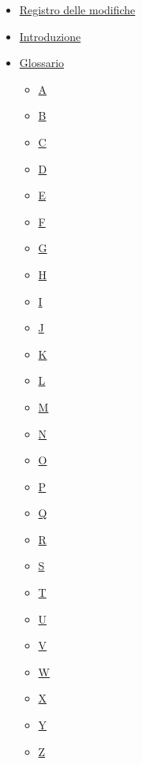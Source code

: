\documentclass[a4paper,12pt]{article}
\begin{document}
\begin{itemize}
    \item \hyperref[sec:Registro delle modifiche]{Registro delle modifiche}
    \item \hyperref[sec:introduzione]{Introduzione}
    \item \hyperref[sec:glossario]{Glossario}
    \begin{itemize}
        \item \hyperref[sec:glossario]{\gls{A}}
        \item \hyperref[sec:glossario]{\gls{B}}
        \item \hyperref[sec:glossario]{\gls{C}}
        \item \hyperref[sec:glossario]{\gls{D}}
        \item \hyperref[sec:glossario]{\gls{E}}
        \item \hyperref[sec:glossario]{\gls{F}}
        \item \hyperref[sec:glossario]{\gls{G}}
        \item \hyperref[sec:glossario]{\gls{H}}
        \item \hyperref[sec:glossario]{\gls{I}}
        \item \hyperref[sec:glossario]{\gls{J}}
        \item \hyperref[sec:glossario]{\gls{K}}
        \item \hyperref[sec:glossario]{\gls{L}}
        \item \hyperref[sec:glossario]{\gls{M}}
        \item \hyperref[sec:glossario]{\gls{N}}
        \item \hyperref[sec:glossario]{\gls{O}}
        \item \hyperref[sec:glossario]{\gls{P}}
        \item \hyperref[sec:glossario]{\gls{Q}}
        \item \hyperref[sec:glossario]{\gls{R}}
        \item \hyperref[sec:glossario]{\gls{S}}
        \item \hyperref[sec:glossario]{\gls{T}}
        \item \hyperref[sec:glossario]{\gls{U}}
        \item \hyperref[sec:glossario]{\gls{V}}
        \item \hyperref[sec:glossario]{\gls{W}}
        \item \hyperref[sec:glossario]{\gls{X}}
        \item \hyperref[sec:glossario]{\gls{Y}}
        \item \hyperref[sec:glossario]{\gls{Z}}
    \end{itemize}
\end{itemize}
\end{document}
